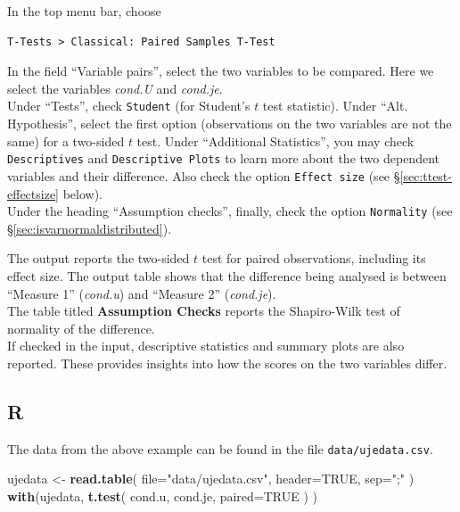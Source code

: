 \documentclass[
]{book}
\newenvironment{Shaded}{\begin{snugshade}}{\end{snugshade}}
\newcommand{\AttributeTok}[1]{\textcolor[rgb]{0.13,0.29,0.53}{#1}}
\newcommand{\ConstantTok}[1]{\textcolor[rgb]{0.56,0.35,0.01}{#1}}
\newcommand{\FunctionTok}[1]{\textcolor[rgb]{0.13,0.29,0.53}{\textbf{#1}}}
\newcommand{\NormalTok}[1]{#1}
\newcommand{\OtherTok}[1]{\textcolor[rgb]{0.56,0.35,0.01}{#1}}
\newcommand{\StringTok}[1]{\textcolor[rgb]{0.31,0.60,0.02}{#1}}
\begin{document}
In the top menu bar, choose

\begin{verbatim}
T-Tests > Classical: Paired Samples T-Test
\end{verbatim}

In the field ``Variable pairs'', select the two variables to be compared. Here we select the variables \emph{cond.U} and \emph{cond.je}.\\
Under ``Tests'', check \texttt{Student} (for Student's \(t\) test statistic). Under ``Alt. Hypothesis'', select the first option (observations on the two variables are not the same) for a two-sided \(t\) test.
Under ``Additional Statistics'', you may check \texttt{Descriptives} and \texttt{Descriptive\ Plots} to learn more about the two dependent variables and their difference. Also check the option \texttt{Effect\ size} (see §\ref{sec:ttest-effectsize} below).\\
Under the heading ``Assumption checks'', finally, check the option \texttt{Normality} (see §\ref{sec:isvarnormaldistributed}).

The output reports the two-sided \(t\) test for paired observations, including its effect size. The output table shows that the difference being analysed is between ``Measure 1'' (\emph{cond.u}) and ``Measure 2'' (\emph{cond.je}).\\
The table titled \textbf{Assumption Checks} reports the Shapiro-Wilk test of normality of the difference.\\
If checked in the input, descriptive statistics and summary plots are also reported. These provides insights into how the scores on the two variables differ.

\hypertarget{sec:R-ttest-paired}{%
\subsection{R}\label{sec:R-ttest-paired}}

The data from the above example can be found in the file \texttt{data/ujedata.csv}.

\begin{Shaded}
\begin{Highlighting}[]
\NormalTok{ujedata }\OtherTok{\textless{}{-}} \FunctionTok{read.table}\NormalTok{( }\AttributeTok{file=}\StringTok{"data/ujedata.csv"}\NormalTok{, }\AttributeTok{header=}\ConstantTok{TRUE}\NormalTok{, }\AttributeTok{sep=}\StringTok{";"}\NormalTok{ )}
\FunctionTok{with}\NormalTok{(ujedata, }\FunctionTok{t.test}\NormalTok{( cond.u, cond.je, }\AttributeTok{paired=}\ConstantTok{TRUE}\NormalTok{ ) )}
\end{Highlighting}
\end{Shaded}
\end{document}
